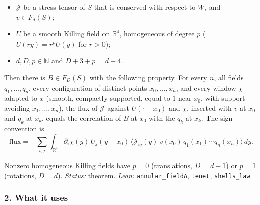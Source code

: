 \documentclass[
  letterpaper,
  11pt]{article}
\providecommand{\tightlist}{%
  \setlength{\itemsep}{0pt}\setlength{\parskip}{0pt}}
\begin{document}
\begin{itemize}
\tightlist
\item
  \(\mathcal J\) be a stress tensor of \(S\) that is conserved with
  respect to \(W\), and \(v\in F_d(S)\);
\item
  \(U\) be a smooth Killing field on \(\mathbb R^4\), homogeneous of
  degree \(p\) (\(U(ry)=r^pU(y)\) for \(r>0\));
\item
  \(d,D,p\in\mathbb N\) and \(D+3+p=d+4\).
\end{itemize}

Then there is \(B\in F_D(S)\) with the following property. For every
\(n\), all fields \(q_1,\dots,q_n\), every configuration of distinct
points \(x_0,\dots,x_n\), and every window \(\chi\) adapted to \(x\)
(smooth, compactly supported, equal to \(1\) near \(x_0\), with support
avoiding \(x_1,\dots,x_n\)), the flux of \(\mathcal J\) against
\(U(\cdot-x_0)\) and \(\chi\), inserted with \(v\) at \(x_0\) and
\(q_k\) at \(x_k\), equals the correlation of \(B\) at \(x_0\) with the
\(q_k\) at \(x_k\). The sign convention is
\[\mathrm{flux}=-\sum_{i,j}\int_{\mathbb R^4}\partial_i\chi(y)\,U_j(y-x_0)\,\langle\mathcal J_{ij}(y)\,v(x_0)\,q_1(x_1)\cdots q_n(x_n)\rangle\,dy.\]

Nonzero homogeneous Killing fields have \(p=0\) (translations,
\(D=d+1\)) or \(p=1\) (rotations, \(D=d\)). \emph{Status:} theorem.
\emph{Lean:}
\href{https://github.com/yang-mills-group/OpenAI-YM-20261028/blob/3456e5e75cf8d4cd558955a5c7638fba2d68f464/YM/MergeProof/West/Bravo.lean\#L55-L89}{\texttt{annular\_fieldA}},
\href{https://github.com/yang-mills-group/OpenAI-YM-20261028/blob/3456e5e75cf8d4cd558955a5c7638fba2d68f464/YM/MergeProof/West/Blanca.lean\#L49-L120}{\texttt{tenet}},
\href{https://github.com/yang-mills-group/OpenAI-YM-20261028/blob/3456e5e75cf8d4cd558955a5c7638fba2d68f464/YM/MergeProof/West/Orange.lean\#L33-L63}{\texttt{shells\_law}}.

\subsubsection{2. What it uses}\label{what-it-uses-13}
\end{document}
